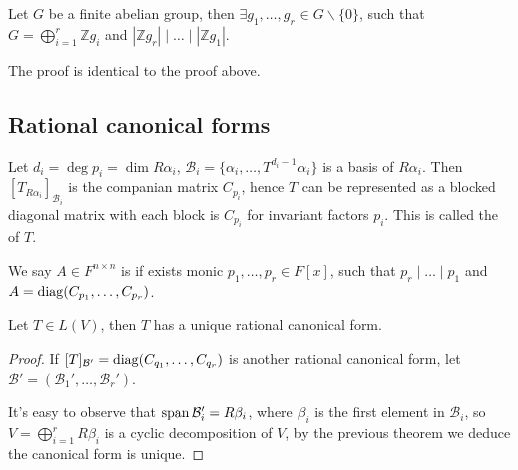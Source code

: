 \begin{theorem}
    Let $G$ be a finite abelian group, then $\exists g_1,\dots,g_r\in G\backslash\{0\}$,
	such that $G = \bigoplus_{i=1}^r \mathbb{Z}g_i$ and
	$|\mathbb{Z}g_r| \mid \dots \mid |\mathbb{Z}g_1|$.
\end{theorem}
\begin{remark}
    The proof is identical to the proof above.
\end{remark}

\subsection{Rational canonical forms}
\label{sub:Rational canonical forms}

Let $d_i = \deg p_i = \dim R\alpha_i$,
$\mathcal{B}_i = \{\alpha_i,\dots,T^{d_i-1}\alpha_i\}$ is a basis of $R\alpha_i$.
Then $[T_{R\alpha_i}]_{\mathcal{B}_i}$ is the companian matrix $C_{p_i}$,
hence $T$ can be represented as a blocked diagonal matrix with
each block is $C_{p_i}$ for invariant factors $p_i$.
This is called the  of $T$.

\begin{definition}
	We say $A\in F^{n\times n}$ is  if exists monic $p_1,\dots,p_r\in F[x]$,
	such that $p_r\mid \dots \mid p_1$ and $A = \operatorname{diag}(C_{p_1},\dots,C_{p_r})$.
\end{definition}

\begin{theorem}
    Let $T\in L(V)$, then $T$ has a unique rational canonical form.
\end{theorem}
\begin{proof}[Proof]
	If $[T]_{\mathcal{B}'}=\operatorname{diag}(C_{q_1},\dots,C_{q_r})$ is another
	rational canonical form, let $\mathcal{B}' = (\mathcal{B}_1',\dots,\mathcal{B}_r')$.

	It's easy to observe that $\operatorname{span} \mathcal{B}_i' = R\beta_i$, where
	$\beta_i$ is the first element in $\mathcal{B}_i$,
	so $V = \bigoplus_{i=1}^r R\beta_i$ is a cyclic decomposition of $V$,
	by the previous theorem we deduce the canonical form is unique.
\end{proof}
